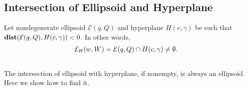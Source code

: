 \documentclass[letterpaper,10pt,english]{sphinxmanual}
\begin{document}
\subsection{Intersection of Ellipsoid and Hyperplane}
\label{chap_ellcalc:intersection-of-ellipsoid-and-hyperplane}
Let nondegenerate ellipsoid ${\mathcal E}(q,Q)$ and hyperplane
$H(c,\gamma)$ be such that
${\bf dist}({\mathcal E}(q,Q),H(c,\gamma))<0$. In other words,
\begin{gather}
\begin{split}{\mathcal E}_H(w,W) = {\mathcal E}(q,Q)\cap H(c,\gamma) \neq \emptyset .\end{split}\notag\\\begin{split}\end{split}\notag
\end{gather}
The intersection of ellipsoid with hyperplane, if nonempty, is always
an ellipsoid. Here we show how to find it.
\end{document}
